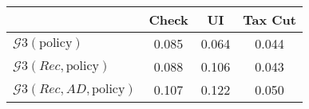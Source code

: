 \begin{tabular}{@{}lccc@{}} 
\toprule 
                          & Check      & UI    & Tax Cut    \\  \midrule 
$\mathcal{G}3(\text{policy})$ & 0.085  & 0.064  & 0.044     \\ 
$\mathcal{G}3(Rec,\text{policy})$ & 0.088  & 0.106  & 0.043     \\ 
$\mathcal{G}3(Rec, AD,\text{policy})$ & 0.107  & 0.122  & 0.050     \\ 
\end{tabular}  
